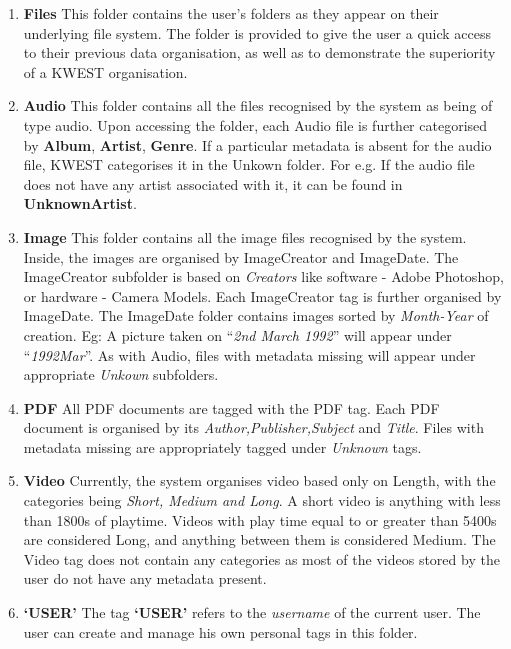 \begin{enumerate}
\item \textbf{Files} \newline
This folder contains the user's folders as they  appear on their underlying file system. The folder is provided to give the user a quick access to their previous data organisation, as well as to demonstrate the superiority of a KWEST organisation.
\item \textbf{Audio} \newline
This folder contains all the files recognised by the system as being of type audio. Upon accessing the folder, each Audio file is further categorised by \textbf{Album}, \textbf{Artist}, \textbf{Genre}. If a particular metadata is absent for the audio file, KWEST categorises it in the Unkown folder. \newline
For e.g. If the audio file does not have any artist associated with it, it can be found in \textbf{UnknownArtist}.

\item \textbf{Image} \newline
This folder contains all the image files recognised by the system. Inside, the images are organised by ImageCreator and ImageDate. 
The ImageCreator subfolder is based on \textit{Creators} like software - Adobe Photoshop, or hardware - Camera Models. Each ImageCreator tag is further organised by ImageDate. 
The ImageDate folder contains images sorted by \textit{Month-Year} of creation. Eg: A picture taken on ``\textit{2nd March 1992}'' will appear under ``\textit{1992Mar}''.
As with Audio, files with metadata missing will appear under appropriate \textit{Unkown} subfolders.

\item \textbf{PDF} \newline
All PDF documents are tagged with the PDF tag. Each PDF document is organised by its \textit{Author,Publisher,Subject} and \textit{Title}. Files with metadata missing are appropriately tagged under \textit{Unknown} tags.

\item \textbf{Video} \newline
Currently, the system organises video based only on Length, with the categories being \textit{Short, Medium and Long}. A short video is anything with less than 1800s of playtime. Videos with play time equal to or greater than 5400s are considered Long, and anything between them is considered Medium. The Video tag does not contain any categories as most of the videos stored by the user do not have any metadata present.

\item \textbf{`USER'} \newline
The tag \textbf{`USER'} refers to the \textit{username} of the current user. The user can create and manage his own personal tags in this folder.
\end{enumerate}

